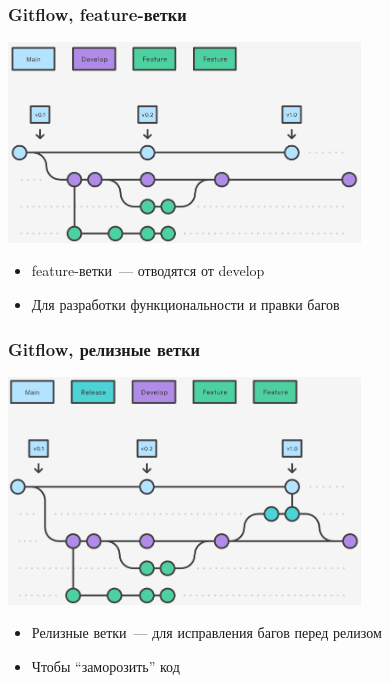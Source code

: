 \documentclass{../../slides-style}
\begin{document}
    \begin{frame}
        \frametitle{Gitflow, feature-ветки}
        \begin{center}
            \includegraphics[width=0.7\textwidth]{gitflow2.png}
        \end{center}
        \begin{itemize}
            \item feature-ветки~--- отводятся от develop
            \item Для разработки функциональности и правки багов
        \end{itemize}
    \end{frame}

    \begin{frame}
        \frametitle{Gitflow, релизные ветки}
        \begin{center}
            \includegraphics[width=0.7\textwidth]{gitflow3.png}
        \end{center}
        \begin{itemize}
            \item Релизные ветки~--- для исправления багов перед релизом
            \item Чтобы ``заморозить'' код
        \end{itemize}
    \end{frame}
\end{document}
